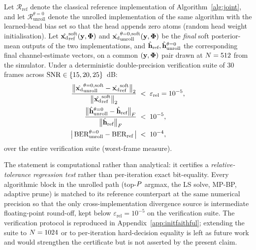\begin{claim}
\label{thm:initfaithful}
Let $\mathcal{R}_\text{ref}$ denote the classical reference
implementation of Algorithm~\ref{alg:joint}, and let
$\mathcal{R}_\text{unroll}^{\theta=0}$ denote the unrolled
implementation of the same algorithm with the learned-head bias set so
that the head appends zero atoms (random head weight initialisation).
Let $\hat{\mathbf{x}_{\mathrm{d}}}_{\text{ref}}^{\text{soft}}(\mathbf{y},\boldsymbol{\Phi})$ and
$\hat{\mathbf{x}_{\mathrm{d}}}_{\text{unroll}}^{\theta=0,\text{soft}}(\mathbf{y},\boldsymbol{\Phi})$ be the
\emph{final} soft posterior-mean outputs of the two implementations,
and $\hat{\mathbf{h}}_\text{ref}, \hat{\mathbf{h}}_\text{unroll}^{\theta=0}$ the
corresponding final channel-estimate vectors, on a common
$(\mathbf{y},\boldsymbol{\Phi})$ pair drawn at $N=512$ from the simulator. Under
a deterministic double-precision verification suite of $30$ frames
across $\mathrm{SNR}\in\{15,20,25\}$~dB:
\begin{align}
\frac{\bigl\|\hat{\mathbf{x}_{\mathrm{d}}}_\text{unroll}^{\theta=0,\text{soft}}
            -\hat{\mathbf{x}_{\mathrm{d}}}_{\text{ref}}^{\text{soft}}\bigr\|_2}
     {\bigl\|\hat{\mathbf{x}_{\mathrm{d}}}_{\text{ref}}^{\text{soft}}\bigr\|_2}
&\;<\;\varepsilon_\text{rel} = 10^{-5},
\label{eq:initfaithful_soft}\\
\frac{\bigl\|\hat{\mathbf{h}}_\text{unroll}^{\theta=0}-\hat{\mathbf{h}}_\text{ref}\bigr\|_F}
     {\bigl\|\hat{\mathbf{h}}_\text{ref}\bigr\|_F}
&\;<\;10^{-5},
\label{eq:initfaithful_chan}\\
\bigl|\,\mathrm{BER}_\text{unroll}^{\theta=0}-\mathrm{BER}_\text{ref}\,\bigr|
&\;<\;10^{-4},
\label{eq:initfaithful_ber}
\end{align}
over the entire verification suite (worst-frame measure).
\end{claim}

The statement is computational rather than analytical: it certifies a
\emph{relative-tolerance regression test} rather than per-iteration
exact bit-equality. Every algorithmic block in the unrolled path
(top-$P$ argmax, the LS solve, MP-BP, adaptive prune) is matched
to its reference counterpart at the same numerical precision so that the
only cross-implementation divergence source is intermediate
floating-point round-off, kept below $\varepsilon_\text{rel}=10^{-5}$
on the verification suite. The verification protocol is reproduced in
Appendix~\ref{app:initfaithful}; extending the suite to $N=1024$
or to per-iteration hard-decision equality is left as future work
and would strengthen the certificate but is not asserted by the
present claim.

